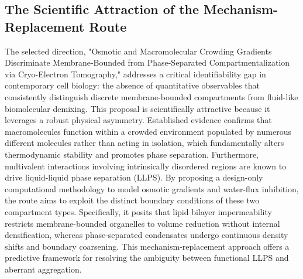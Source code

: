 \documentclass[conference]{IEEEtran}
\begin{document}
\subsection{The Scientific Attraction of the Mechanism-Replacement Route}
The selected direction, "Osmotic and Macromolecular Crowding Gradients Discriminate Membrane-Bounded from Phase-Separated Compartmentalization via Cryo-Electron Tomography," addresses a critical identifiability gap in contemporary cell biology: the absence of quantitative observables that consistently distinguish discrete membrane-bounded compartments from fluid-like biomolecular demixing. This proposal is scientifically attractive because it leverages a robust physical asymmetry. Established evidence confirms that macromolecules function within a crowded environment populated by numerous different molecules rather than acting in isolation, which fundamentally alters thermodynamic stability and promotes phase separation. Furthermore, multivalent interactions involving intrinsically disordered regions are known to drive liquid-liquid phase separation (LLPS). By proposing a design-only computational methodology to model osmotic gradients and water-flux inhibition, the route aims to exploit the distinct boundary conditions of these two compartment types. Specifically, it posits that lipid bilayer impermeability restricts membrane-bounded organelles to volume reduction without internal densification, whereas phase-separated condensates undergo continuous density shifts and boundary coarsening. This mechanism-replacement approach offers a predictive framework for resolving the ambiguity between functional LLPS and aberrant aggregation.~\cite{cite_42ed299a53990c06,cite_7161cfcb40366dd0}
\end{document}
